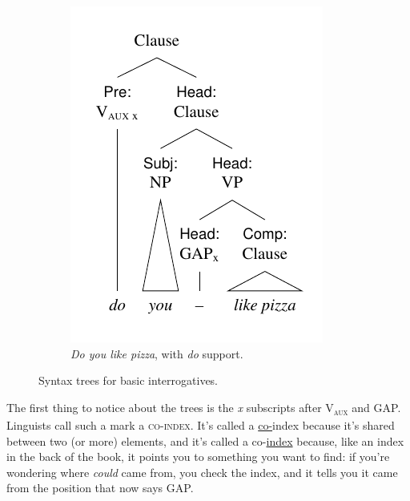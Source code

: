 \begin{figure}[htb]
\begin{subfigure}[b]{0.48\textwidth}
    \centering
    \includegraphics[width=.91\textwidth]{figures/do-you-like-tree.pdf}
    \caption{\textit{Do you like pizza}, with \textit{do} support.}
    \label{fig:do-you-like}
  \end{subfigure}
  \caption{Syntax trees for basic interrogatives.}
  \label{fig:combined-trees}
\end{figure}

The first thing to notice about the trees is the \textit{x} subscripts after V\textsubscript{\textsc{aux}} and GAP. Linguists call such a mark a \textsc{co-index}. It's called a \uline{co-}index because it's shared between two (or more) elements, and it's called a co-\uline{index} because, like an index in the back of the book, it points you to something you want to find: if you're wondering where \textit{could} came from, you check the index, and it tells you it came from the position that now says GAP.

